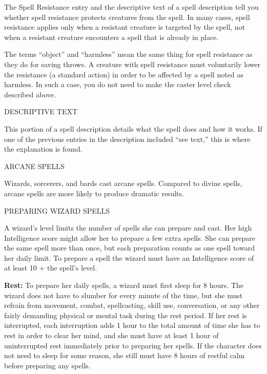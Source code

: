 \documentclass{article}
\begin{document}
The Spell Resistance entry and the descriptive text of a spell description tell 
you whether spell resistance protects creatures from the spell. In many cases, 
spell resistance applies only when a resistant creature is targeted by the spell, 
not when a resistant creature encounters a spell that is already in place.

The terms ``object'' and ``harmless'' mean the same thing for spell resistance 
as they do for saving throws. A creature with spell resistance must voluntarily 
lower the resistance (a standard action) in order to be affected by a spell noted 
as harmless. In such a case, you do not need to make the caster level check described 
above.

\vspace{12pt}
DESCRIPTIVE TEXT

This portion of a spell description details what the spell does and how it works. 
If one of the previous entries in the description included ``see text,'' this is 
where the explanation is found. 

\vspace{12pt}
{\LARGE{}ARCANE SPELLS}

Wizards, sorcerers, and bards cast arcane spells. Compared to divine spells, arcane 
spells are more likely to produce dramatic results.

\vspace{12pt}
PREPARING WIZARD SPELLS

A wizard's level limits the number of spells she can prepare and cast. Her high 
Intelligence score might allow her to prepare a few extra spells. She can prepare 
the same spell more than once, but each preparation counts as one spell toward 
her daily limit. To prepare a spell the wizard must have an Intelligence score 
of at least 10 + the spell's level.

\textbf{Rest: }To prepare her daily spells, a wizard must first sleep for 8 hours. 
The wizard does not have to slumber for every minute of the time, but she must 
refrain from movement, combat, spellcasting, skill use, conversation, or any other 
fairly demanding physical or mental task during the rest period. If her rest is 
interrupted, each interruption adds 1 hour to the total amount of time she has 
to rest in order to clear her mind, and she must have at least 1 hour of uninterrupted 
rest immediately prior to preparing her spells. If the character does not need 
to sleep for some reason, she still must have 8 hours of restful calm before preparing 
any spells. 
\end{document}
